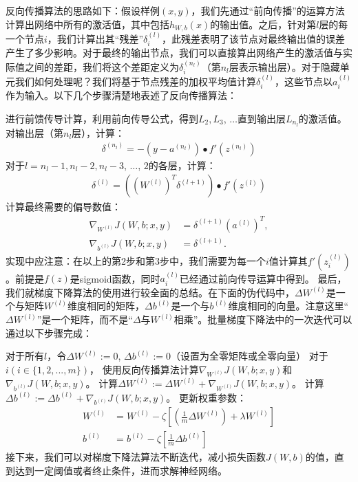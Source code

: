 反向传播算法的思路如下：假设样例$(x,y)$，我们先通过“前向传播”的运算方法计算出网络中所有的激活值，其中包括$h_{W,b}(x)$的输出值。之后，针对第$l$层的每一个节点$i$，我们计算出其“残差”$\delta^{(l)}_i$，此残差表明了该节点对最终输出值的误差产生了多少影响。对于最终的输出节点，我们可以直接算出网络产生的激活值与实际值之间的差距，我们将这个差距定义为$\delta^{(n_l)}_i$（第$n_l$层表示输出层）。对于隐藏单元我们如何处理呢？我们将基于节点残差的加权平均值计算$\delta^{(l)}_i$，这些节点以$a^{(l)}_i$作为输入。以下几个步骤清楚地表述了反向传播算法：\par
进行前馈传导计算，利用前向传导公式，得到$L_2, L_3$, $\ldots$直到输出层$L_{n_l}$的激活值。
对输出层（第$n_l$层），计算：
\begin{align}
	\delta^{(n_l)}
	= - (y - a^{(n_l)}) \bullet f'(z^{(n_l)})
\end{align}
对于$l = n_l-1, n_l-2, n_l-3$, $\ldots$, $2$的各层，计算：
\begin{align}
	\delta^{(l)} = \left((W^{(l)})^T \delta^{(l+1)}\right) \bullet f'(z^{(l)})
\end{align}
计算最终需要的偏导数值：
\begin{align}
	\nabla_{W^{(l)}} J(W,b;x,y) &= \delta^{(l+1)} (a^{(l)})^T, \\
	\nabla_{b^{(l)}} J(W,b;x,y) &= \delta^{(l+1)}.
\end{align}
实现中应注意：在以上的第2步和第3步中，我们需要为每一个$i$值计算其$f'(z^{(l)}_i)$。前提是$f(z)$是sigmoid函数，同时$a^{(l)}_i$已经通过前向传导运算中得到。
最后，我们就梯度下降算法的使用进行较全面的总结。在下面的伪代码中，$\Delta W^{(l)}$是一个与矩阵$W^{(l)}$维度相同的矩阵，$\Delta b^{(l)}$是一个与$b^{(l)}$维度相同的向量。注意这里“$\Delta W^{(l)}$”是一个矩阵，而不是“$ \Delta$与$W^{(l)}$相乘”。批量梯度下降法中的一次迭代可以通过以下步骤完成：\par

对于所有$l$，令$\Delta W^{(l)} := 0$, $\Delta b^{(l)} := 0 $（设置为全零矩阵或全零向量）
对于$i(i \in \{1, 2, ..., m\})$，
使用反向传播算法计算$\nabla_{W^{(l)}} J(W,b;x,y)$和$\nabla_{b^{(l)}} J(W,b;x,y)$。
计算$\Delta W^{(l)} := \Delta W^{(l)} + \nabla_{W^{(l)}} J(W,b;x,y)$。
计算$\Delta b^{(l)} := \Delta b^{(l)} + \nabla_{b^{(l)}} J(W,b;x,y)$。
更新权重参数：
\begin{align}
	W^{(l)} &= W^{(l)} - \zeta \left[ \left(\frac{1}{m} \Delta W^{(l)} \right) + \lambda W^{(l)}\right] \\
	b^{(l)} &= b^{(l)} - \zeta \left[\frac{1}{m} \Delta b^{(l)}\right]
\end{align}
接下来，我们可以对梯度下降法算法不断迭代，减小损失函数$J(W,b)$的值，直到达到一定阈值或者终止条件，进而求解神经网络。


